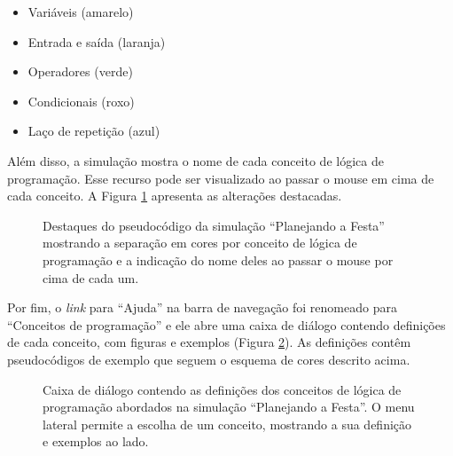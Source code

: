 
\begin{itemize}
    \item \colorbox{variables}{Variáveis} (amarelo)
    \item \colorbox{inputOutput}{Entrada} e \colorbox{inputOutput}{saída} (laranja)
    \item \colorbox{operators}{Operadores} (verde)
    \item \colorbox{conditional}{Condicionais} (roxo)
    \item \colorbox{loop}{Laço de repetição} (azul)
\end{itemize}

\noindent Além disso, a simulação mostra o nome de cada conceito de lógica de programação. Esse recurso pode ser visualizado ao passar o mouse em cima de cada conceito. A Figura \ref{figure:pseudocodigo_destaque} apresenta as alterações destacadas.

\begin{figure}[h!]
    \centering
    \setlength{\fboxrule}{0.1pt} %
    \caption{Destaques do pseudocódigo da simulação \enquote{Planejando a Festa} mostrando a separação em cores por conceito de lógica de programação e a indicação do nome deles ao passar o mouse por cima de cada um.}
    \label{figure:pseudocodigo_destaque}
\end{figure}

Por fim, o \textit{link} para \enquote{Ajuda} na barra de navegação foi renomeado para \enquote{Conceitos de programação} e ele abre uma caixa de diálogo contendo definições de cada conceito, com figuras e exemplos (Figura \ref{figure:conceitos_programacao}). As definições contêm pseudocódigos de exemplo que seguem o esquema de cores descrito acima.

\begin{figure}[h!]
    \centering
    \setlength{\fboxrule}{0.1pt} %
    \caption{Caixa de diálogo contendo as definições dos conceitos de lógica de programação abordados na simulação \enquote{Planejando a Festa}. O menu lateral permite a escolha de um conceito, mostrando a sua definição e exemplos ao lado.}
    \label{figure:conceitos_programacao}
\end{figure}
